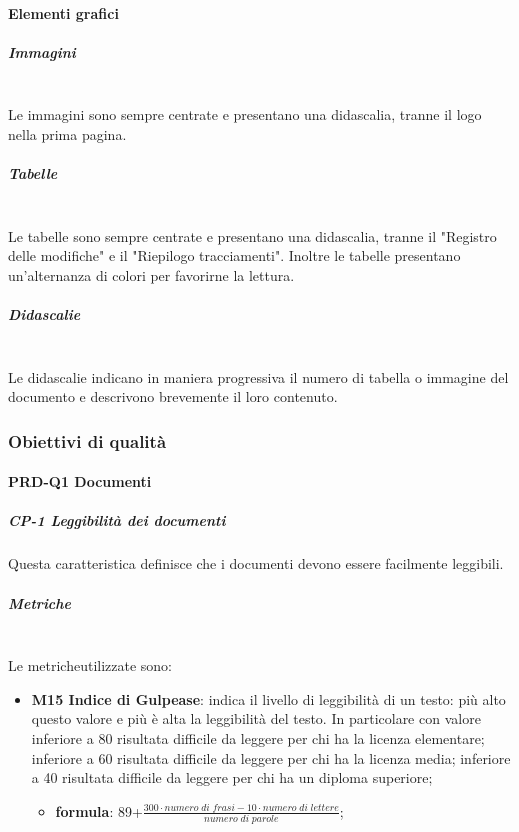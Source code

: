             \paragraph{Elementi grafici}
                \subparagraph{Immagini}\mbox{}\\ [1mm]
                    Le immagini sono sempre centrate e presentano una didascalia, tranne il logo nella prima pagina.
                \subparagraph{Tabelle}\mbox{}\\ [1mm]
                    Le tabelle sono sempre centrate e presentano una didascalia, tranne il "Registro delle modifiche" e il "Riepilogo tracciamenti".
                    Inoltre le tabelle presentano un'alternanza di colori per favorirne la lettura.
                \subparagraph{Didascalie}\mbox{}\\ [1mm]
                    Le didascalie indicano in maniera progressiva il numero di tabella o immagine del documento e descrivono brevemente il loro contenuto.

          \subsubsection{Obiettivi di qualità}
	          \paragraph{PRD-Q1 Documenti}
		          \subparagraph{CP-1 Leggibilità dei documenti}
		          Questa caratteristica definisce che i documenti devono essere facilmente leggibili.
		          \subparagraph{Metriche}\mbox{}\\ [1mm]
		          Le metriche\glosp utilizzate sono:   
	          	  \begin{itemize}
		          	  	\item \textbf{M15 Indice di Gulpease}: indica il livello di leggibilità di un testo: più alto questo valore e più è alta la leggibilità del testo. In particolare con valore inferiore a 80 risultata difficile da leggere per chi ha la licenza elementare; inferiore a 60 risultata difficile da leggere per chi ha la licenza media; inferiore a 40 risultata difficile da leggere per chi ha un diploma superiore;
		          	  	\begin{itemize}
		          	  		\item[] \textbf{formula}: 89+$\frac{300\cdot numero \; di \; frasi-10\cdot numero \; di \; lettere}{numero \; di \; parole}$;
		          	  	\end{itemize}               
	          	  \end{itemize}
	         
